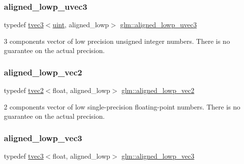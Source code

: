 \subsubsection{\texorpdfstring{aligned\+\_\+lowp\+\_\+uvec3}{aligned\_lowp\_uvec3}}
{\footnotesize\ttfamily typedef \hyperlink{structglm_1_1tvec3}{tvec3}$<$\hyperlink{group__core__precision_ga4fd29415871152bfb5abd588334147c8}{uint}, aligned\+\_\+lowp$>$ \hyperlink{group__gtc__type__aligned_ga3d3b253d6dc1d1ac3b1732f65fd83901}{glm\+::aligned\+\_\+lowp\+\_\+uvec3}}

3 components vector of low precision unsigned integer numbers. There is no guarantee on the actual precision. \mbox{\label{group__gtc__type__aligned_gab09a9786d58f065dafde28b725cc5370}} 
\subsubsection{\texorpdfstring{aligned\+\_\+lowp\+\_\+vec2}{aligned\_lowp\_vec2}}
{\footnotesize\ttfamily typedef \hyperlink{structglm_1_1tvec2}{tvec2}$<$float, aligned\+\_\+lowp$>$ \hyperlink{group__gtc__type__aligned_gab09a9786d58f065dafde28b725cc5370}{glm\+::aligned\+\_\+lowp\+\_\+vec2}}

2 components vector of low single-\/precision floating-\/point numbers. There is no guarantee on the actual precision. \mbox{\label{group__gtc__type__aligned_ga19ab3efcfafe1def4240723f7056ca79}} 
\subsubsection{\texorpdfstring{aligned\+\_\+lowp\+\_\+vec3}{aligned\_lowp\_vec3}}
{\footnotesize\ttfamily typedef \hyperlink{structglm_1_1tvec3}{tvec3}$<$float, aligned\+\_\+lowp$>$ \hyperlink{group__gtc__type__aligned_ga19ab3efcfafe1def4240723f7056ca79}{glm\+::aligned\+\_\+lowp\+\_\+vec3}}

